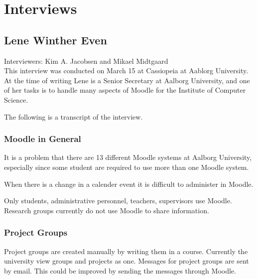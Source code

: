\chapter{Interviews}

\section{Lene Winther Even}
Interviewers: Kim A. Jacobsen and Mikael Midtgaard\\


This interview was conducted on March 15\ths{} at Cassiopeia at Aablorg University.
At the time of writing Lene is a Senior Secretary at Aalborg University, and one of her tasks is to handle many aspects of Moodle for the Institute of Computer Science.

The following is a transcript of the interview.

\subsection{Moodle in General}
It is a problem that there are 13 different Moodle systems at Aalborg University, especially since some student are required to use more than one Moodle system.

When there is a change in a calender event it is difficult to administer in Moodle.

Only students, administrative personnel, teachers, supervisors use Moodle.
Research groups currently do not use Moodle to share information.

\subsection{Project Groups}
Project groups are created manually by writing them in a course.
Currently the university view groups and projects as one.
Messages for project groups are sent by email.
This could be improved by sending the messages through Moodle.
